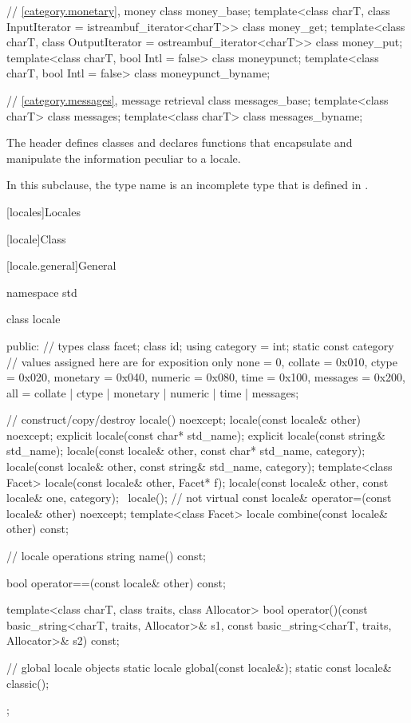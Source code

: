 \begin{codeblock}
{  // \ref{category.monetary}, money
  class money_base;
  template<class charT, class InputIterator = istreambuf_iterator<charT>>
    class money_get;
  template<class charT, class OutputIterator = ostreambuf_iterator<charT>>
    class money_put;
  template<class charT, bool Intl = false>
    class moneypunct;
  template<class charT, bool Intl = false>
    class moneypunct_byname;

  // \ref{category.messages}, message retrieval
  class messages_base;
  template<class charT> class messages;
  template<class charT> class messages_byname;
}
\end{codeblock}

\pnum
The header 
defines classes and declares functions
that encapsulate and manipulate the information peculiar to a locale.
\begin{footnote}
In this subclause, the type name 
is an incomplete type that is defined in .
\end{footnote}

[locales]{Locales}

[locale]{Class }

[locale.general]{General}

\begin{codeblock}
namespace std {
  class locale {
  public:
    // types
    class facet;
    class id;
    using category = int;
    static const category   // values assigned here are for exposition only
      none     = 0,
      collate  = 0x010, ctype    = 0x020,
      monetary = 0x040, numeric  = 0x080,
      time     = 0x100, messages = 0x200,
      all = collate | ctype | monetary | numeric | time  | messages;

    // construct/copy/destroy
    locale() noexcept;
    locale(const locale& other) noexcept;
    explicit locale(const char* std_name);
    explicit locale(const string& std_name);
    locale(const locale& other, const char* std_name, category);
    locale(const locale& other, const string& std_name, category);
    template<class Facet> locale(const locale& other, Facet* f);
    locale(const locale& other, const locale& one, category);
    ~locale();                  // not virtual
    const locale& operator=(const locale& other) noexcept;
    template<class Facet> locale combine(const locale& other) const;

    // locale operations
    string name() const;

    bool operator==(const locale& other) const;

    template<class charT, class traits, class Allocator>
      bool operator()(const basic_string<charT, traits, Allocator>& s1,
                      const basic_string<charT, traits, Allocator>& s2) const;

    // global locale objects
    static       locale  global(const locale&);
    static const locale& classic();
  };
}
\end{codeblock}


